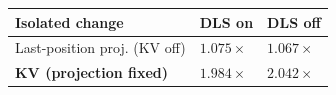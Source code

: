 \TGformat{}
\begin{tabular}{>{\raggedright\arraybackslash}p{128.80pt}>{\centering\arraybackslash}p{61.00pt}>{\centering\arraybackslash}p{61.00pt}}
\toprule
\textbf{Isolated change} & \textbf{DLS on} & \textbf{DLS off} \\
\midrule
Last-position proj. (KV off) & $1.075\times$ & $1.067\times$ \\
\rowcolor{TGshade}
\textbf{KV (projection fixed)} & $1.984\times$ & $2.042\times$ \\
\bottomrule
\end{tabular}\par
